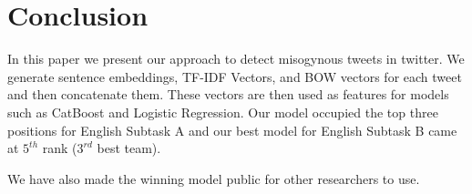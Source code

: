 \documentclass[11pt]{article}
\begin{document}
\section{Conclusion}

In this paper we present our approach to detect misogynous tweets in twitter. We generate sentence embeddings, TF-IDF Vectors, and BOW vectors for each tweet and then concatenate them. These vectors are then used as features for models such as CatBoost and Logistic Regression. Our model occupied the top three positions for English Subtask A and our best model for English Subtask B came at $5^{th}$ rank ($3^{rd}$ best team).




We have also made the winning model public for other researchers to use.



\end{document}
